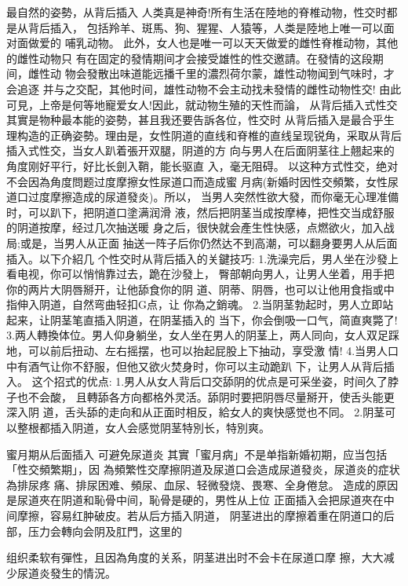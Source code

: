 \documentclass[12pt,UTF8]{ctexbook}
\begin{document}
最自然的姿勢，从背后插入
人类真是神奇!所有生活在陸地的脊椎动物，性交时都是从背后插入，
包括羚羊、斑馬、狗、猩猩、人猿等，人类是陸地上唯一可以面对面做爱的
哺乳动物。
此外，女人也是唯一可以天天做爱的雌性脊椎动物，其他的雌性动物只
有在固定的發情期间才会接受雄性的性交邀請。在發情的这段期间，雌性动
物会發散出味道能远播千里的濃烈荷尔蒙，雄性动物闻到气味时，才会追逐
并与之交配，其他时间，雄性动物不会主动找未發情的雌性动物性交!
由此可見，上帝是何等地寵爱女人!因此，就动物生殖的天性而論，
从背后插入式性交其實是物种最本能的姿勢，甚且我还要告訴各位，性交时
从背后插入是最合乎生理构造的正确姿勢。理由是，女性阴道的直线和脊椎的直线呈现锐角，采取从背后插入式性交，当女人趴着張开双腿，阴道的方
向与男人在后面阴茎往上翹起来的角度刚好平行，好比长劍入鞘，能长驱直
入，毫无阻碍。
以这种方式性交，绝对不会因為角度問题过度摩擦女性尿道口而造成蜜
月病(新婚时因性交頻繁，女性尿道口过度摩擦造成的尿道發炎)。所以，
当男人突然性欲大發，而你毫无心理准備时，可以趴下，把阴道口塗满润滑
液，然后把阴茎当成按摩棒，把性交当成舒服的阴道按摩，经过几次抽送暖
身之后，很快就会產生性快感，点燃欲火，加入战局;或是，当男人从正面
抽送一阵子后你仍然达不到高潮，可以翻身要男人从后面插入。以下介紹几
个性交时从背后插入的关鍵技巧:
1.洗澡完后，男人坐在沙發上看电视，你可以悄悄靠过去，跪在沙發上，
臀部朝向男人，让男人坐着，用手把你的两片大阴唇掰开，让他舔食你的阴
道、阴蒂、阴唇，也可以让他用食指或中指伸入阴道，自然弯曲轻扣G点，让
你為之銷魂。
2.当阴茎勃起时，男人立即站起来，让阴茎笔直插入阴道，在阴茎插入的
当下，你会倒吸一口气，简直爽斃了!
3.两人轉換体位。男人仰身躺坐，女人坐在男人的阴茎上，两人同向，女人双足踩地，可以前后扭动、左右摇摆，也可以抬起屁股上下抽动，享受激
情!
4.当男人口中有酒气让你不舒服，但他又欲火焚身时，你可以主动跪趴
下，让男人从背后插入。
这个招式的优点:
1.男人从女人背后口交舔阴的优点是可采坐姿，时间久了脖子也不会酸，
且轉舔各方向都格外灵活。舔阴时要把阴唇尽量掰开，使舌头能更深入阴
道，舌头舔的走向和从正面时相反，給女人的爽快感觉也不同。
2.阴茎可以整根都插入阴道，女人会感觉阴茎特別长，特別爽。

蜜月期从后面插入
可避免尿道炎
其實「蜜月病」不是单指新婚初期，应当包括「性交頻繁期」，因
為頻繁性交摩擦阴道及尿道口会造成尿道發炎，尿道炎的症状為排尿疼
痛、排尿困难、頻尿、血尿、轻微發烧、畏寒、全身倦怠。
造成的原因是尿道夾在阴道和恥骨中间，恥骨是硬的，男性从上位
正面插入会把尿道夾在中间摩擦，容易红肿破皮。若从后方插入阴道，
阴茎进出的摩擦着重在阴道口的后部，压力会轉向会阴及肛門，这里的

组织柔软有彈性，且因為角度的关系，阴茎进出时不会卡在尿道口摩
擦，大大减少尿道炎發生的情況。
\end{document}
